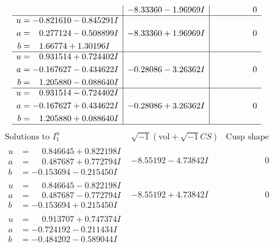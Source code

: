 \documentclass[1p]{elsarticle_modified}
\theoremstyle{definition}
\newcommand{\I}{\sqrt{-1}}
\begin{document}
$$\begin{array}{c|c|c}
 & -8.33360 - 1.96969 I & \phantom{-0.000000 } 0 \\ \hline\begin{aligned}
u &= -0.821610 - 0.845291 I \\
a &= \phantom{-}0.277124 - 0.508899 I \\
b &= \phantom{-}1.66774 + 1.30196 I\end{aligned}
 & -8.33360 + 1.96969 I & \phantom{-0.000000 } 0 \\ \hline\begin{aligned}
u &= \phantom{-}0.931514 + 0.724402 I \\
a &= -0.167627 - 0.434622 I \\
b &= \phantom{-}1.205880 - 0.088640 I\end{aligned}
 & -0.28086 - 3.26362 I & \phantom{-0.000000 } 0 \\ \hline\begin{aligned}
u &= \phantom{-}0.931514 - 0.724402 I \\
a &= -0.167627 + 0.434622 I \\
b &= \phantom{-}1.205880 + 0.088640 I\end{aligned}
 & -0.28086 + 3.26362 I & \phantom{-0.000000 } 0\\
 \hline 
 \end{array}$$\newpage$$\begin{array}{c|c|c}  
\text{Solutions to }I^u_{1}& \I (\text{vol} + \sqrt{-1}CS) & \text{Cusp shape}\\
 \hline 
\begin{aligned}
u &= \phantom{-}0.846645 + 0.822198 I \\
a &= \phantom{-}0.487687 + 0.772794 I \\
b &= -0.153694 - 0.215450 I\end{aligned}
 & -8.55192 - 4.73842 I & \phantom{-0.000000 } 0 \\ \hline\begin{aligned}
u &= \phantom{-}0.846645 - 0.822198 I \\
a &= \phantom{-}0.487687 - 0.772794 I \\
b &= -0.153694 + 0.215450 I\end{aligned}
 & -8.55192 + 4.73842 I & \phantom{-0.000000 } 0 \\ \hline\begin{aligned}
u &= \phantom{-}0.913707 + 0.747374 I \\
a &= -0.724192 - 0.211434 I \\
b &= -0.484202 - 0.589044 I\end{aligned}

\end{array}$$
\end{document}
